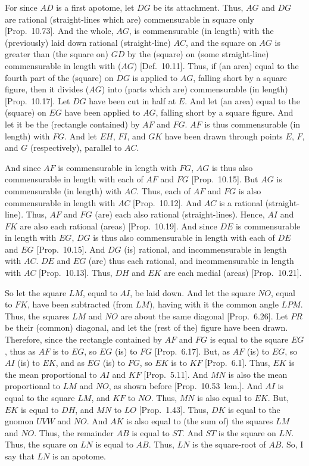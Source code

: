 \begin{Parallel}{}{}
{\epsfysize=1.3in
\centerline{}

For since $AD$ is a first apotome, let $DG$ be its attachment. Thus,
$AG$ and $DG$ are rational (straight-lines which are) commensurable in
square only [Prop.~10.73]. And the whole, $AG$,
is commensurable (in length) with the (previously) laid down rational (straight-line)
$AC$, and the square on $AG$ is greater than (the square on) $GD$
by the (square) on  (some straight-line) commensurable in length with ($AG$) [Def.~10.11]. Thus, if (an area) equal to the
fourth part of the (square) on $DG$ is applied to $AG$, falling short
by a square figure, then it divides ($AG$) into (parts which are) commensurable
(in length) [Prop.~10.17]. Let $DG$
have been cut in half at $E$. And let (an area) equal to the (square) on
$EG$ have been applied to $AG$, falling short by a square figure. And let
it be the (rectangle contained) by $AF$ and $FG$. $AF$ is
 thus commensurable (in length) with $FG$. And let $EH$, $FI$, and $GK$
have been drawn through points $E$, $F$, and $G$ (respectively),
parallel to $AC$.

And since $AF$ is commensurable in length with $FG$, $AG$ is thus also
commensurable in length with each of $AF$ and $FG$ [Prop.~10.15]. But $AG$ is commensurable (in length)
with $AC$. Thus, each of $AF$ and $FG$ is also commensurable in length with $AC$ 
[Prop.~10.12]. 
And $AC$ is a rational (straight-line). Thus,  $AF$ and $FG$ (are) each
also rational (straight-lines). Hence, $AI$ and
$FK$ are also each rational (areas) [Prop.~10.19]. And since $DE$ is commensurable
in length with $EG$, $DG$ is thus also commensurable
in length with each of $DE$ and $EG$ [Prop.~10.15]. And $DG$ (is) rational, and
incommensurable in length with $AC$. $DE$ and $EG$ (are) thus each
rational, and incommensurable in length with $AC$ [Prop.~10.13]. Thus, $DH$ and $EK$ are
each medial (areas) [Prop.~10.21].

So let the square $LM$, equal to $AI$, be laid down. And let the square $NO$,
equal to $FK$, have been
subtracted (from $LM$), having with it the common angle $LPM$. Thus,
the squares $LM$ and $NO$ are about the same diagonal [Prop.~6.26]. Let $PR$ be their (common) diagonal, and
let the (rest of the) figure have been drawn. Therefore, since
the rectangle contained by $AF$ and $FG$ is equal to the square $EG$,
thus as $AF$ is to $EG$, so $EG$ (is) to $FG$ [Prop.~6.17]. But, as $AF$ (is) to $EG$, so $AI$ (is)
to $EK$, and as $EG$ (is) to $FG$, so $EK$ is to $KF$ [Prop.~6.1]. Thus, $EK$ is the mean proportional
to $AI$ and $KF$ [Prop.~5.11]. And $MN$ is also the mean proportional to
$LM$ and $NO$, as shown before [Prop.~10.53~lem.].  And $AI$ is equal to the
square $LM$, and $KF$ to $NO$. Thus, $MN$ is also equal to $EK$.
But, $EK$ is equal to $DH$, and $MN$ to $LO$ [Prop.~1.43]. Thus, $DK$ is equal to the
gnomon $UVW$ and  $NO$. And $AK$ is also equal to 
(the sum of) the squares $LM$ and $NO$.  Thus, the remainder $AB$ is equal
to $ST$. And $ST$ is the square on $LN$. Thus, the square on $LN$
is equal to $AB$. Thus, $LN$ is the square-root of $AB$. So, I say that
$LN$ is an apotome.

}
\end{Parallel}
